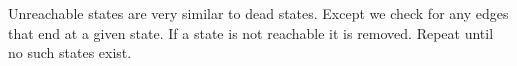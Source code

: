 Unreachable states are very similar to dead states.
Except we check for any edges that end at a given state.
If a state is not reachable it is removed.
Repeat until no such states exist.

